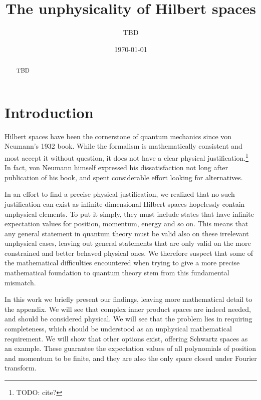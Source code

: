 \documentclass[10pt,twocolumn, nofootinbib]{revtex4-2}
\begin{document}
\title{The unphysicality of Hilbert spaces}
\author{TBD}

\date{\today}


\begin{abstract}
TBD
\end{abstract}

\maketitle

\section{Introduction}

Hilbert spaces have been the cornerstone of quantum mechanics since von Neumann's 1932 book.\cite{von_neumann_mathematische_1996} While the formalism is mathematically consistent and most accept it without question, it does not have a clear physical justification.\footnote{TODO: cite?} In fact, von Neumann himself expressed his dissatisfaction not long after publication of his book, and spent considerable effort looking for alternatives.\cite{vonNeumannHilbert_1996}

In an effort to find a precise physical justification, we realized that no such justification can exist as infinite-dimensional Hilbert spaces hopelessly contain unphysical elements. To put it simply, they must include states that have infinite expectation values for position, momentum, energy and so on. This means that any general statement in quantum theory must be valid also on these irrelevant unphysical cases, leaving out general statements that are only valid on the more constrained and better behaved physical ones. We therefore suspect that some of the mathematical difficulties encountered when trying to give a more precise mathematical foundation to quantum theory stem from this fundamental mismatch.

In this work we briefly present our findings, leaving more mathematical detail to the appendix. We will see that complex inner product spaces are indeed needed, and should be considered physical. We will see that the problem lies in requiring completeness, which should be understood as an unphysical mathematical requirement. We will show that other options exist, offering Schwartz spaces as an example. These guarantee the expectation values of all polynomials of position and momentum to be finite, and they are also the only space closed under Fourier transform.
\end{document}
